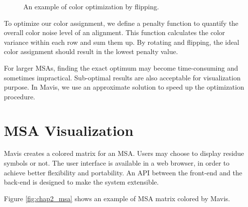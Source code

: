 \begin{figure}[hbt]
\caption[Color Optimization by Flipping]{An example of color optimization by flipping.}\label{fig:chap2_flip}
\end{figure}

To optimize our color assignment, we define a penalty function to quantify the overall color noise level of an alignment. This function calculates the color variance within each row and sum them up. By rotating and flipping, the ideal color assignment should result in the lowest penalty value.

For larger MSAs, finding the exact optimum may become time-consuming and sometimes impractical. Sub-optimal results are also acceptable for visualization purpose. In Mavis, we use an approximate solution to speed up the optimization procedure.

\section{MSA Visualization}

Mavis creates a colored matrix for an MSA. Users may choose to display residue symbols or not. The user interface is available in a web browser, in order to achieve better flexibility and portability. An API between the front-end and the back-end is designed to make the system extensible.

Figure \ref{fig:chap2_msa} shows an example of MSA matrix colored by Mavis.

